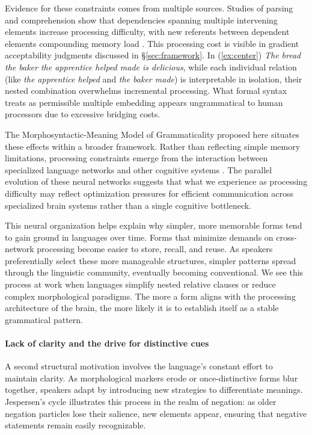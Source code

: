 \documentclass[12pt,letterpaper]{article}
\begin{document}
Evidence for these constraints comes from multiple sources. Studies of parsing and comprehension show that dependencies spanning multiple intervening elements increase processing difficulty, with new referents between dependent elements compounding memory load \autocite{gibson2000,Gibson2024}. This processing cost is visible in gradient acceptability judgments discussed in \S\ref{sec:framework}. In (\ref{ex:center}) \textit{The bread the baker the apprentice helped made is delicious}, while each individual relation (like \textit{the apprentice helped} and \textit{the baker made}) is interpretable in isolation, their nested combination overwhelms incremental processing. What formal syntax treats as permissible multiple embedding appears ungrammatical to human processors due to excessive bridging costs.

The Morphosyntactic-Meaning Model of Grammaticality proposed here situates these effects within a broader framework. Rather than reflecting simple memory limitations, processing constraints emerge from the interaction between specialized language networks and other cognitive systems \autocite{Fedorenko2024}. The parallel evolution of these neural networks suggests that what we experience as processing difficulty may reflect optimization pressures for efficient communication across specialized brain systems rather than a single cognitive bottleneck.

This neural organization helps explain why simpler, more memorable forms tend to gain ground in languages over time. Forms that minimize demands on cross-network processing become easier to store, recall, and reuse. As speakers preferentially select these more manageable structures, simpler patterns spread through the linguistic community, eventually becoming conventional. We see this process at work when languages simplify nested relative clauses or reduce complex morphological paradigms. The more a form aligns with the processing architecture of the brain, the more likely it is to establish itself as a stable grammatical pattern.

\paragraph{Lack of clarity and the drive for distinctive cues}

A second structural motivation involves the language’s constant effort to maintain clarity. As morphological markers erode or once-distinctive forms blur together, speakers adapt by introducing new strategies to differentiate meanings. Jespersen’s cycle illustrates this process in the realm of negation: as older negation particles lose their salience, new elements appear, ensuring that negative statements remain easily recognizable.
\end{document}
